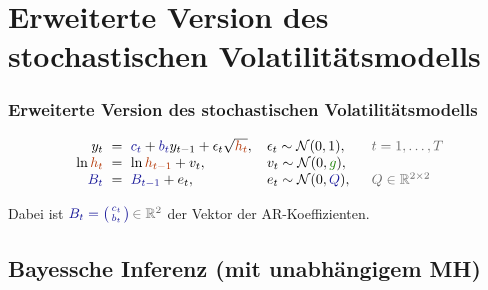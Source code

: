 \documentclass[10pt]{beamer}
\theoremstyle{definition}
\newcommand{\R}{\mathbb{R}} %
\newcommand{\Normal}{\mathcal{N}} %
\newcommand{\stepOne}[1]{\textcolor{StepOneColor}{#1}}
\newcommand{\stepTwo}[1]{\textcolor{StepTwoColor}{#1}}
\newcommand{\stepThree}[1]{\textcolor{StepThreeColor}{#1}}
\newcommand{\typeInfo}[1]{\textcolor{TypeInfoColor}{#1}}
\begin{document}
\section[Erweitertes stoch. Volatilitätsmodell]{Erweiterte Version des stochastischen Volatilitätsmodells}

\begin{frame}
  \frametitle{Erweiterte Version des stochastischen Volatilitätsmodells}
  \begin{modelbox}
    \[
      \arraycolsep=3pt
      \begin{array}{rclll}
        y_t &=& \stepThree{c_t} + \stepThree{b_t} y_{t-1} + \epsilon_t \sqrt{\stepOne{h_t}}, & \enspace \epsilon_t \sim \Normal(0, 1), & \quad \typeInfo{t = 1, \ldots, T} \\
        \ln \stepOne{h_t} &=& \ln \stepOne{h_{t-1}} + v_t, & \enspace v_t \sim \Normal(0, \stepTwo{g}), \\
        \stepThree{B_t} &=& \stepThree{B_{t-1}} + e_t, & \enspace e_t \sim \Normal(0, \stepThree{Q}), & \quad \typeInfo{Q \in \R^{2 \times 2}}
      \end{array}
    \]
  \end{modelbox}
  Dabei ist $\stepThree{B_t = \begin{psmallmatrix} c_t \\ b_t \end{psmallmatrix}} \typeInfo{\,\in \R^2}$ der Vektor der AR-Koeffizienten.
\end{frame}

\subsection{Bayessche Inferenz (mit unabhängigem MH)}
\end{document}
